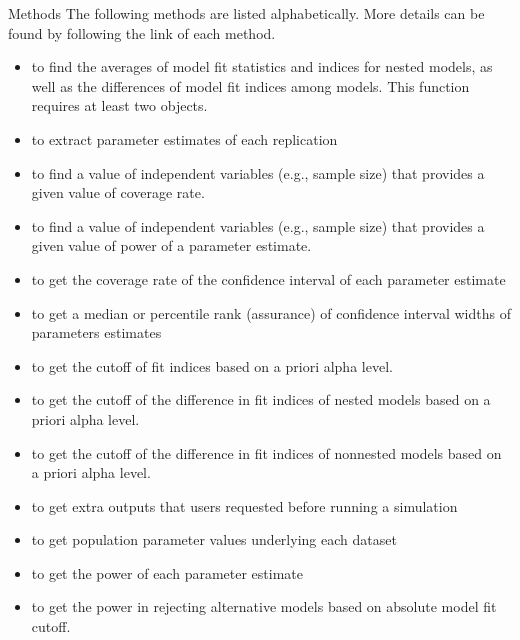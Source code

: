 \documentclass[a4paper]{book}
\begin{document}
%
\begin{Section}{Methods}
The following methods are listed alphabetically. More details can be found by following the link of each method.
\begin{itemize}

\item {} to find the averages of model fit statistics and indices for nested models, as well as the differences of model fit indices among models. This function requires at least two  objects. 
\item {} to extract parameter estimates of each replication
\item {} to find a value of independent variables (e.g., sample size) that provides a given value of coverage rate.
\item {} to find a value of independent variables (e.g., sample size) that provides a given value of power of a parameter estimate. 
\item {} to get the coverage rate of the confidence interval of each parameter estimate
\item {} to get a median or percentile rank (assurance) of confidence interval widths of parameters estimates
\item {} to get the cutoff of fit indices based on a priori alpha level.
\item {} to get the cutoff of the difference in fit indices of nested models based on a priori alpha level. 
\item {} to get the cutoff of the difference in fit indices of nonnested models based on a priori alpha level. 
\item {} to get extra outputs that users requested before running a simulation
\item {} to get population parameter values underlying each dataset
\item {} to get the power of each parameter estimate
\item {} to get the power in rejecting alternative models based on absolute model fit cutoff. 

\end{itemize}
\end{Section}
\end{document}
